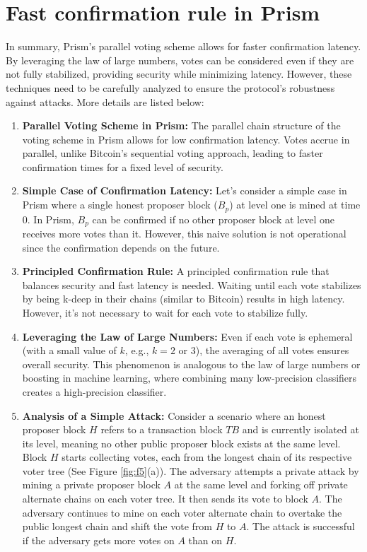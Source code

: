 \documentclass{report}
\begin{document}
\section{Fast confirmation rule in Prism}
In summary, Prism's parallel voting scheme allows for faster confirmation latency. By leveraging the law of large numbers, votes can be considered even if they are not fully stabilized, providing security while minimizing latency. However, these techniques need to be carefully analyzed to ensure the protocol's robustness against attacks. More details are listed below:
\begin{enumerate}
	\item \textbf{Parallel Voting Scheme in Prism:} The parallel chain structure of the voting scheme in Prism allows for low confirmation latency. Votes accrue in parallel, unlike Bitcoin's sequential voting approach, leading to faster confirmation times for a fixed level of security.
	\item \textbf{Simple Case of Confirmation Latency:} Let's consider a simple case in Prism where a single honest proposer block ($B_{p}$) at level one is mined at time $0$. In Prism, $B_{p}$ can be confirmed if no other proposer block at level one receives more votes than it. However, this naive solution is not operational since the confirmation depends on the future.
	\item \textbf{Principled Confirmation Rule:} A principled confirmation rule that balances security and fast latency is needed. Waiting until each vote stabilizes by being k-deep in their chains (similar to Bitcoin) results in high latency. However, it's not necessary to wait for each vote to stabilize fully.
	\item \textbf{Leveraging the Law of Large Numbers:} Even if each vote is ephemeral (with a small value of $k$, e.g., $k = 2$ or $3$), the averaging of all votes ensures overall security. This phenomenon is analogous to the law of large numbers or boosting in machine learning, where combining many low-precision classifiers creates a high-precision classifier.
	\item \textbf{Analysis of a Simple Attack:} Consider a scenario where an honest proposer block $H$ refers to a transaction block $TB$ and is currently isolated at its level, meaning no other public proposer block exists at the same level. Block $H$ starts collecting votes, each from the longest chain of its respective voter tree (See Figure \ref{fig:f5}(a)). The adversary attempts a private attack by mining a private proposer block $A$ at the same level and forking off private alternate chains on each voter tree. It then sends its vote to block $A$. The adversary continues to mine on each voter alternate chain to overtake the public longest chain and shift the vote from $H$ to $A$. The attack is successful if the adversary gets more votes on $A$ than on $H$.
\end{enumerate}
\end{document}
